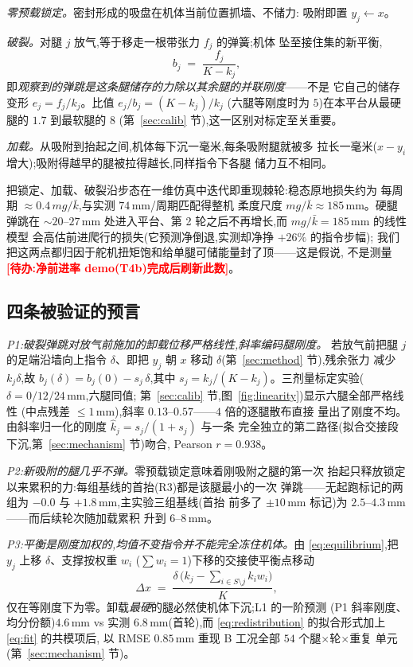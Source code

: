 \documentclass[journal]{IEEEtran}
\newcommand{\TODO}[1]{\textcolor{red}{\textbf{[待办:#1]}}}
\begin{document}
\emph{零预载锁定。}密封形成的吸盘在机体当前位置抓墙、不储力:
吸附即置 $y_j \leftarrow x$。

\emph{破裂。}对腿 $j$ 放气,等于移走一根带张力 $f_j$ 的弹簧;机体
坠至接住集的新平衡,
\begin{equation}
b_j \;=\; \frac{f_j}{K - k_j},
\label{eq:bounce}
\end{equation}
即\emph{观察到的弹跳是这条腿储存的力除以其余腿的并联刚度}——不是
它自己的储存变形 $e_j = f_j/k_j$。比值 $e_j/b_j = (K-k_j)/k_j$
(六腿等刚度时为 $5$)在本平台从最硬腿的 $1.7$ 到最软腿的 $8$
(第~\ref{sec:calib} 节),这一区别对标定至关重要。

\emph{加载。}从吸附到抬起之间,机体每下沉一毫米,每条吸附腿就被多
拉长一毫米($x-y_i$ 增大);吸附得越早的腿被拉得越长,同样指令下各腿
储力互不相同。

把锁定、加载、破裂沿步态在一维仿真中迭代即重现棘轮:稳态原地损失约为
每周期 ${\approx}0.4\,mg/\bar{k}$,与实测 $74$\,mm/周期匹配得整机
柔度尺度 $mg/\bar{k}\approx185$\,mm。硬腿弹跳在 ${\sim}20$--$27$\,mm
处进入平台、第 2 轮之后不再增长,而 $mg/\bar{k}=185$\,mm 的线性模型
会高估前进爬行的损失(它预测净倒退,实测却净挣 $+26\%$ 的指令步幅);
我们把这两点都归因于舵机扭矩饱和给单腿可储能量封了顶——这是假说,
不是测量 \TODO{净前进率 demo(T4b)完成后刷新此数}。

\subsection{四条被验证的预言}
\label{sec:predictions}

\emph{P1:破裂弹跳对放气前施加的卸载位移严格线性,斜率编码腿刚度。}
若放气前把腿 $j$ 的足端沿墙向上指令 $\delta$、即把 $y_j$ 朝 $x$ 移动
$\delta$(第~\ref{sec:method} 节),残余张力
减少 $k_j\delta$,故 $b_j(\delta) = b_j(0) - s_j\,\delta$,其中
$s_j = k_j/(K-k_j)$。三剂量标定实验($\delta = 0/12/24$\,mm,六腿同值;
第~\ref{sec:calib} 节,图~\ref{fig:linearity})显示六腿全部严格线性
(中点残差 $\le1$\,mm),斜率 $0.13$--$0.57$——$4$ 倍的逐腿散布直接
量出了刚度不均。由斜率归一化的刚度 $\hat{k}_j = s_j/(1+s_j)$ 与一条
完全独立的第二路径(拟合交接段下沉,第~\ref{sec:mechanism} 节)吻合,
Pearson $r=0.938$。

\emph{P2:新吸附的腿几乎不弹。}零预载锁定意味着刚吸附之腿的第一次
抬起只释放锁定以来累积的力:每组基线的首抬(R3)都是该腿最小的一次
弹跳——无起跑标记的两组为 $-0.0$ 与 $+1.8$\,mm,主实验三组基线(首抬
前多了 $\pm10$\,mm 标记)为 $2.5$--$4.3$\,mm——而后续轮次随加载累积
升到 $6$--$8$\,mm。

\emph{P3:平衡是刚度加权的,均值不变指令并不能完全冻住机体。}由
\eqref{eq:equilibrium},把 $y_j$ 上移 $\delta$、支撑按权重 $w_i$
($\sum w_i = 1$)下移的交接使平衡点移动
\begin{equation}
\Delta x \;=\; \frac{\delta\,\bigl(k_j - \sum_{i\in S\setminus j} k_i
w_i\bigr)}{K},
\label{eq:redistribution}
\end{equation}
仅在等刚度下为零。卸载\emph{最硬}的腿必然使机体下沉;L1 的一阶预测
(P1 斜率刚度、均分份额)$4.6$\,mm vs 实测 $6.8$\,mm(首轮),而
\eqref{eq:redistribution} 的拟合形式加上 \eqref{eq:fit} 的共模项后,
以 RMSE $0.85$\,mm 重现 B 工况全部 $54$ 个腿$\times$轮$\times$重复
单元(第~\ref{sec:mechanism} 节)。
\end{document}
